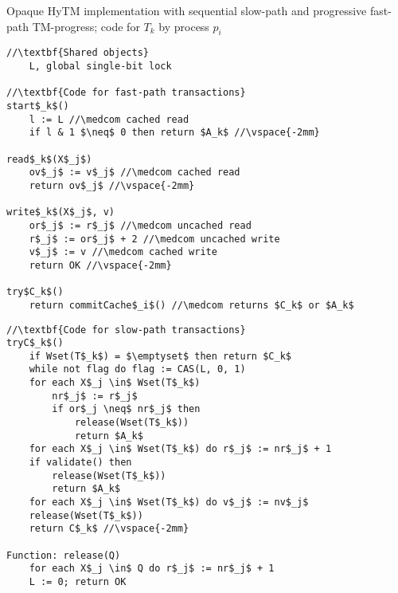 \begin{algorithm*}[!ht]
\caption{Opaque HyTM implementation with sequential slow-path and progressive fast-path TM-progress; code for $T_k$ by process $p_i$}
\label{alg:inswrite2}
\vspace{-2mm}
\noindent\lstset{style=customc}
\begin{minipage}{0.49\textwidth}
\begin{lstlisting}[frame=none,firstnumber=1,mathescape=true]
//\textbf{Shared objects}
    L, global single-bit lock

//\textbf{Code for fast-path transactions}
start$_k$()
    l := L //\medcom cached read
    if l & 1 $\neq$ 0 then return $A_k$ //\vspace{-2mm}

read$_k$(X$_j$)
    ov$_j$ := v$_j$ //\medcom cached read
    return ov$_j$ //\vspace{-2mm}

write$_k$(X$_j$, v)
    or$_j$ := r$_j$ //\medcom uncached read
    r$_j$ := or$_j$ + 2 //\medcom uncached write
    v$_j$ := v //\medcom cached write
    return OK //\vspace{-2mm}

try$C_k$()
    return commitCache$_i$() //\medcom returns $C_k$ or $A_k$
\end{lstlisting}
\end{minipage}
\begin{minipage}{0.49\textwidth}
\begin{lstlisting}[frame=none,firstnumber=last,mathescape=true]
//\textbf{Code for slow-path transactions}
tryC$_k$()
    if Wset(T$_k$) = $\emptyset$ then return $C_k$
    while not flag do flag := CAS(L, 0, 1)
    for each X$_j \in$ Wset(T$_k$)
        nr$_j$ := r$_j$
        if or$_j \neq$ nr$_j$ then
            release(Wset(T$_k$))
            return $A_k$
    for each X$_j \in$ Wset(T$_k$) do r$_j$ := nr$_j$ + 1
    if validate() then
        release(Wset(T$_k$))
        return $A_k$
    for each X$_j \in$ Wset(T$_k$) do v$_j$ := nv$_j$
    release(Wset(T$_k$))
    return C$_k$ //\vspace{-2mm}
    
Function: release(Q)
    for each X$_j \in$ Q do r$_j$ := nr$_j$ + 1
    L := 0; return OK
\end{lstlisting}
\end{minipage}
\vspace{-2mm}
\end{algorithm*}
